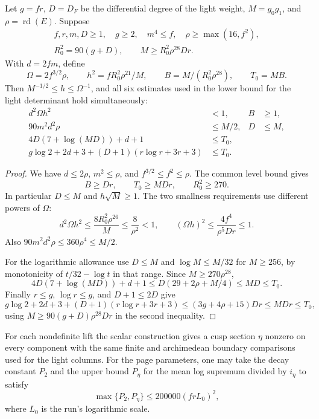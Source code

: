 \begin{auxlemma}
\label{lem:joint-theta-parameters}
Let \(g=fr\), \(D=D_F\) be the differential degree of the light weight,
\(M=g_0g_1\), and \(\rho=\operatorname{rd}(E)\). Suppose
\[
 \begin{gathered}
 f,r,m,D\ge1,\quad g\ge2,\quad m^4\le f,\quad \rho\ge\max(16,f^2),\\
 R_0^2=90(g+D),\qquad M\ge R_0^2\rho^{28}Dr .
 \end{gathered}
\]
With \(d=2fm\), define
\[
 \Omega=2f^{3/2}\rho,\qquad h^2=fR_0^2\rho^{21}/M,\qquad
 B=M/(R_0^2\rho^{28}),\qquad T_0=MB .
\]
Then \(M^{-1/2}\le h\le\Omega^{-1}\), and all six estimates used
in the lower bound for the light determinant hold simultaneously:
\begin{align}
 d^2\Omega h^2&<1, & B&\ge1,\label{eq:joint-theta-smallness}\\
 90m^2d^2\rho&\le M/2, & D&\le M,\label{eq:joint-theta-dimension}\\
 4D(7+\log(MD))+d+1 &\le T_0,\label{eq:joint-theta-log-cost}\\
 g\log2+2d+3+(D+1)(r\log r+3r+3)&\le T_0.\label{eq:joint-theta-rank-cost}
\end{align}
\end{auxlemma}
\begin{proof}
We have \(d\le2\rho\), \(m^2\le\rho\), and
\(f^{3/2}\le f^2\le\rho\). The common level bound gives
\[
 B\ge Dr,\qquad T_0\ge MDr,\qquad R_0^2\ge270.
\]
In particular \(D\le M\) and \(h\sqrt{M}\ge1\). The two
smallness requirements use different powers of \(\Omega\):
\[
 d^2\Omega h^2\le\frac{8R_0^2\rho^{26}}M\le\frac8{\rho^2}<1,
 \qquad (\Omega h)^2\le\frac{4 f^4}{\rho^5Dr}\le1.
\]
Also \(90m^2d^2\rho\le360\rho^4\le M/2\).

For the logarithmic allowance use \(D\le M\) and
\(\log M\le M/32\) for \(M\ge256\), by monotonicity of
\(t/32-\log t\) in that range. Since \(M\ge270\rho^{28}\),
\[
 4D(7+\log(MD))+d+1
 \le D(29+2\rho+M/4)\le MD\le T_0 .
\]
Finally \(r\le g\), \(\log r\le g\), and \(D+1\le2D\) give
\[
 g\log2+2d+3+(D+1)(r\log r+3r+3)
 \le (3g+4\rho+15)Dr\le MDr\le T_0 ,
\]
using \(M\ge90(g+D)\rho^{28}Dr\) in the second inequality.
\end{proof}

\begin{proposition}
\label{prop:auxiliary-scalar-section}
For each nondefinite lift the scalar construction gives a cusp section
\(\eta\) nonzero on every component with the same finite and
archimedean boundary comparisons used for the light columns. For the
page parameters, one may take the decay constant \(P_2\) and the upper bound \(P_\eta\) for the mean log supremum divided by \(i_\eta\) to satisfy
\[
 \max\{P_2,P_\eta\}\le200000(frL_0)^2,
\]
where \(L_0\) is the run's logarithmic scale.
\end{proposition}

